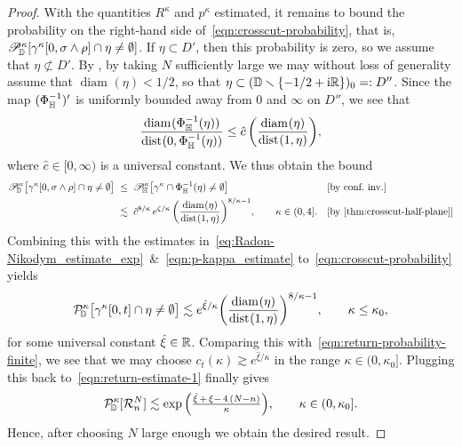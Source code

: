 \documentclass[a4paper, 11pt]{article}
\theoremstyle{definition}
\numberwithin{equation}{section}
\numberwithin{figure}{section}
\renewcommand{\dist}[1][]{\operatorname{dist}_{#1}}
\renewcommand{\diam}[1][]{\operatorname{diam}_{#1}}
\newcommand{\rDmeas}[1]{\mathcal{P}^{#1}_{\!\bD}}
\newcommand{\cHmeas}[1]{\mathscr{P}^{#1}_{\!\bH}}
\newcommand{\cDmeas}[1]{\mathscr{P}^{#1}_{\!\bD}}
\newcommand{\component}[2]{(#1)_{#2}}
\newcommand{\returnevent}[2]{\mathcal{R}_{#1}^{#2}}
\begin{document}
\begin{proof}
With the quantities $R^{\kappa}$ and $p^\kappa$ estimated, 
it remains to bound the probability on the right-hand side of~\eqref{eqn:crosscut-probability}, that is, 
$\cDmeas{\kappa}[\gamma^\kappa[0,\sigma \wedge \rho] \cap \eta \ne \emptyset]$. 
If $\eta \subset D'$, then this probability is zero, so we assume that $\eta \not\subset D'$. 
By , by taking $N$ sufficiently large 
we may without loss of generality assume that $\diam(\eta) < 1/2$, 
so that $\eta \subset \component{\bD\smallsetminus\{-1/2 + \ii\bR\}}{0} =: D''$. 
Since the map $(\Phi_{\mathbb{H}}^{-1})'$ is uniformly bounded away from $0$ and $\infty$ on $D''$,
we see that 
\begin{align*}
\frac{\diam(\Phi_\bH^{-1}(\eta))}{\dist(0, \Phi_\bH^{-1}(\eta))} \le \hat c \, \bigg(\frac{\diam(\eta)}{\dist(1, \eta)}\bigg) ,
\end{align*}
where $\hat c \in [0,\infty)$ is a universal constant.
We thus obtain the bound
\begin{align*}
\cDmeas{\kappa}\big[\gamma^\kappa[0,\sigma \wedge \rho] \cap \eta \ne \emptyset\big] 
\; \le \;\; & \cHmeas{\kappa}\big[\gamma^\kappa \cap \Phi_\bH^{-1}(\eta) \ne \emptyset\big] 
&& \textnormal{[by conf.~inv.]} \\
\; \lesssim \;\; & \hat c^{8/\kappa} \, e^{\zeta/\kappa} \, \bigg(\frac{\diam(\eta)}{\dist(1, \eta)}\bigg)^{8/\kappa - 1}
, \qquad \kappa \in (0,4] .
&& \textnormal{[by \Cref{thm:crosscut-half-plane}]}
\end{align*}
Combining this with the estimates in~\eqref{eq:Radon-Nikodym_estimate_exp}~\&~\eqref{eqn:p-kappa_estimate} to~\eqref{eqn:crosscut-probability} yields  
\begin{align*}
\rDmeas{\kappa}\big[\gamma^\kappa[0,t] \cap \eta \ne \emptyset\big] 
\lesssim e^{\hat{\xi} / \kappa} \bigg(\frac{\diam(\eta)}{\dist(1, \eta)}\bigg)^{8/\kappa - 1}, \qquad \kappa \le \kappa_0 ,
\end{align*}
for some universal constant $\hat \xi \in \mathbb{R}$. 
Comparing this with~\eqref{eqn:return-probability-finite}, 
we see that we may choose 
$c_t(\kappa) \gtrsim e^{\hat{\xi}/\kappa}$ in the range $\kappa \in (0,\kappa_0]$. 
Plugging this back to~\eqref{eqn:return-estimate-1} finally gives 
\begin{align*}
\rDmeas{\kappa}[\returnevent{n}{N}] \lesssim 
\exp\Big( \tfrac{\hat \xi \, + \, \xi- \, 4 \, (N-n)}{\kappa}\Big) 
, \qquad \kappa \in (0, \kappa_0].
\end{align*}
Hence, after choosing $N$ large enough we obtain the desired result.
\end{proof}
\end{document}
